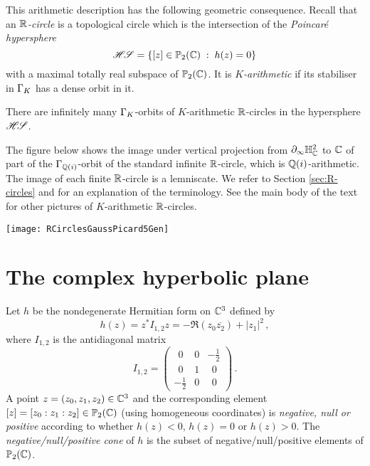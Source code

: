 \documentclass[11pt]{article}
\begin{document}
This arithmetic description has the following geometric consequence.
Recall that an {\it ${\mathbb R}$-circle} is a topological circle which is the
intersection of the {\it Poincaré hypersphere}
$$
\mathscr{H\!S}=\{[z]\in{\mathbb P}_2({\mathbb C})\;:\;h(z)=0\}
$$ 
with a maximal totally real subspace of ${\mathbb P}_2({\mathbb C})$. It is {\it
  $K$-arithmetic} if its stabiliser in $\Gamma_K$ has a dense orbit in
it.


\bcoro \label{coro:intro} There are infinitely many $\Gamma_K$-orbits of
$K$-arithmetic ${\mathbb R}$-circles in the hypersphere $\mathscr{H\!S}$.  
\ecoro

The figure below shows the image under vertical projection from
$\partial_\infty{\mathbb H}^2_{\mathbb C}$ to ${\mathbb C}$ of part of the
$\Gamma_{{\mathbb Q}(i)}$-orbit of the standard infinite ${\mathbb R}$-circle, which is
${\mathbb Q}(i)$-arithmetic. The image of each finite ${\mathbb R}$-circle is a
lemniscate. We refer to Section \ref{sec:R-circles} and \cite[\S
  4.4]{Goldman99} for an explanation of the terminology. See the main
body of the text for other pictures of $K$-arithmetic ${\mathbb R}$-circles.

\medskip 

\begin{center}
\texttt{[image: RCirclesGaussPicard5Gen]}
\end{center}





\section{The complex hyperbolic plane}
\label{sec:cxhyp}



Let $h$ be the nondegenerate Hermitian form on ${\mathbb C}^3$ defined by
$$
h(z)=z^*I_{1,2}z=-\Re(z_0\overline{z_2})+|z_1|^2\,,
$$
where $I_{1,2}$ is the antidiagonal matrix
$$
I_{1,2}=\begin{pmatrix} \ \ 0 & 0 & -\frac{1}{2} \\ \ \ 0 & 1 &\ \  0 \\ 
-\frac{1}{2} & 0 & \ \ 0 \end{pmatrix}\,.
$$ 
A point $z=(z_0,z_1,z_2)\in{\mathbb C}^3$ and the corresponding element
$[z]=[z_0:z_1:z_2]\in {\mathbb P}_2({\mathbb C})$ (using homogeneous coordinates) is
{\em negative, null or positive} according to whether $h(z)<0$,
$h(z)=0$ or $h(z)>0$.  The {\it negative/null/positive cone} of $h$ is
the subset of negative/null/positive elements of $ {\mathbb P}_2({\mathbb C})$.
\end{document}
